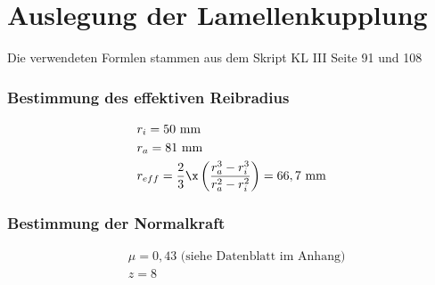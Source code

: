 \section{Auslegung der Lamellenkupplung}
Die verwendeten Formlen stammen aus dem Skript KL III  Seite 91 und 108 
\subsubsection{Bestimmung des effektiven Reibradius}
\begin{align*}
	&r_i = 50  \text{ mm} \\
	&r_a = 81  \text{ mm} \\
	&r_{eff} = \frac{2}{3} \x \left( \frac{r_a^3- r_i^3}{r_a^2 - r_i ^2} \right) = 66,7 \text{ mm} \\
\end{align*}
\subsubsection{Bestimmung der Normalkraft}
\begin{align*}
	&\mu = 0,43 \text{ (siehe Datenblatt im Anhang)} \\
	&z= 8 
\end{align*}
